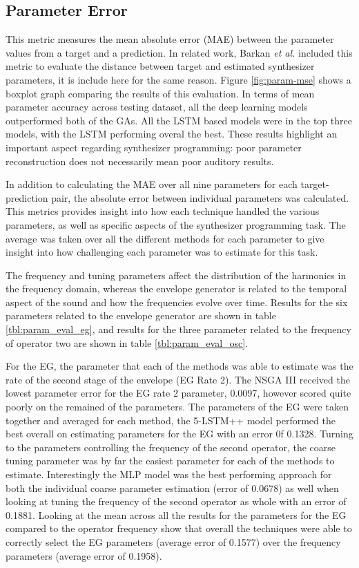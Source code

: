 \subsection{Parameter Error}
This metric measures the mean absolute error (MAE) between the parameter values from a target and a prediction. In related work, Barkan \textit{et al.} included this metric to evaluate the distance between target and estimated synthesizer parameters, it is include here for the same reason. Figure \ref{fig:param-mse} shows a boxplot graph comparing the results of this evaluation. In terms of mean parameter accuracy across testing dataset, all the deep learning models outperformed both of the GAs. All the LSTM based models were in the top three models, with the LSTM performing overal the best. These results highlight an important aspect regarding synthesizer programming: poor parameter reconstruction does not necessarily mean poor auditory results.

In addition to calculating the MAE over all nine parameters for each target-prediction pair, the absolute error between individual parameters was calculated. This metrics provides insight into how each technique handled the various parameters, as well as specific aspects of the synthesizer programming task. The average was taken over all the different methods for each parameter to give insight into how challenging each parameter was to estimate for this task. 

The frequency and tuning parameters affect the distribution of the harmonics in the frequency domain, whereas the envelope generator is related to the temporal aspect of the sound and how the frequencies evolve over time. Results for the six parameters related to the envelope generator are shown in table \ref{tbl:param_eval_eg}, and results for the three parameter related to the frequency of operator two are shown in table \ref{tbl:param_eval_osc}. 

For the EG, the parameter that each of the methods was able to estimate was the rate of the second stage of the envelope (EG Rate 2). The NSGA III received the lowest parameter error for the EG rate 2 parameter, 0.0097, however scored quite poorly on the remained of the parameters. The parameters of the EG were taken together and averaged for each method, the 5-LSTM++ model performed the best overall on estimating parameters for the EG with an error 0f 0.1328. Turning to the parameters controlling the frequency of the second operator, the coarse tuning parameter was by far the easiest parameter for each of the methods to estimate. Interestingly the MLP model was the best performing approach for both the individual coarse parameter estimation (error of 0.0678) as well when looking at tuning the frequency of the second operator as whole with an error of 0.1881. Looking at the mean across all the results for the parameters for the EG compared to the operator frequency show that overall the techniques were able to correctly select the EG parameters (average error of 0.1577) over the frequency parameters (average error of 0.1958).

